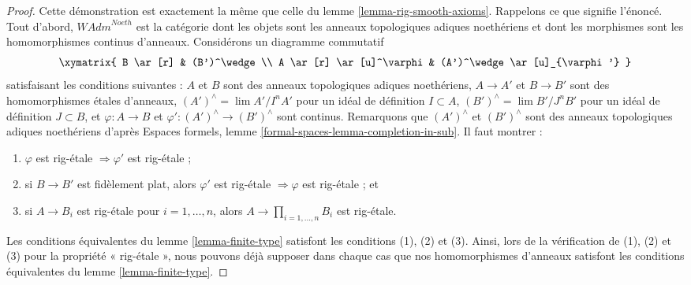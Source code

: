 \begin{proof}
Cette démonstration est exactement la même que celle du
lemme \ref{lemma-rig-smooth-axioms}.
Rappelons ce que signifie l'énoncé. Tout d'abord, 
$\textit{WAdm}^{Noeth}$ est la catégorie dont les objets sont les
anneaux topologiques adiques noethériens et dont les morphismes sont les
homomorphismes continus d'anneaux. Considérons un diagramme commutatif
$$
\xymatrix{
B \ar[r] & (B')^\wedge \\
A \ar[r] \ar[u]^\varphi & (A')^\wedge \ar[u]_{\varphi'}
}
$$
satisfaisant les conditions suivantes :
$A$ et $B$ sont des anneaux topologiques adiques noethériens,
$A \to A'$ et $B \to B'$ sont des homomorphismes étales d'anneaux,
$(A')^\wedge = \lim A'/I^nA'$ pour un idéal de définition $I \subset A$,
$(B')^\wedge = \lim B'/J^nB'$ pour un idéal de définition $J \subset B$, et
$\varphi : A \to B$ et $\varphi' : (A')^\wedge \to (B')^\wedge$
sont continus. Remarquons que $(A')^\wedge$ et $(B')^\wedge$ sont des
anneaux topologiques adiques noethériens d'après
Espaces formels, lemme \ref{formal-spaces-lemma-completion-in-sub}.
Il faut montrer :
\begin{enumerate}
\item $\varphi$ est rig-étale $\Rightarrow \varphi'$ est rig-étale ;
\item si $B \to B'$ est fidèlement plat, alors $\varphi'$ est rig-étale
$\Rightarrow \varphi$ est rig-étale ; et
\item si $A \to B_i$ est rig-étale pour $i = 1, \ldots, n$, alors
$A \to \prod_{i = 1, \ldots, n} B_i$ est rig-étale.
\end{enumerate}
Les conditions équivalentes du lemme \ref{lemma-finite-type} satisfont
les conditions (1), (2) et (3).
Ainsi, lors de la vérification de (1), (2) et (3) pour la propriété
« rig-étale », nous pouvons déjà supposer dans chaque cas que nos
homomorphismes d'anneaux satisfont les conditions équivalentes du
lemme \ref{lemma-finite-type}.


\end{proof}
